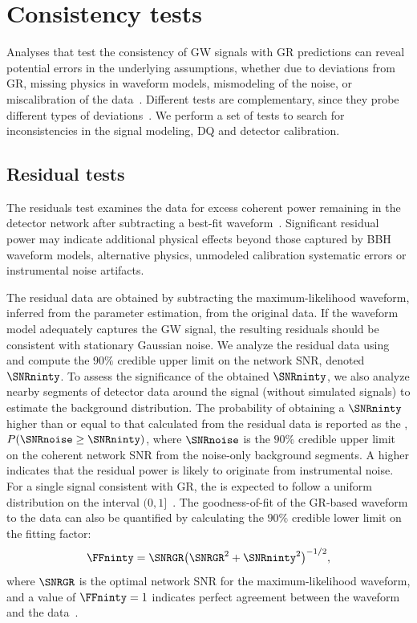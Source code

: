 \section{Consistency tests}

Analyses that test the consistency of \ac{GW} signals with \ac{GR} predictions can reveal potential errors in the underlying assumptions, whether due to deviations from \ac{GR}, missing physics in waveform models, mismodeling of the noise, or miscalibration of the data~\cite{LIGOScientific:2021sio,Gupta:2024gun,LIGOScientific:2025cmm}.
Different tests are complementary, since they probe different types of deviations~\cite{Johnson-McDaniel:2021yge}.
We perform a set of tests to search for inconsistencies in the signal modeling, \ac{DQ} and detector calibration.

\subsection{Residual tests}
The residuals test examines the data for excess coherent power remaining in the detector network after subtracting a best-fit waveform~\cite{LIGOScientific:2021sio,Johnson-McDaniel:2021yge,LIGOScientific:2026qni}.
Significant residual power may indicate additional physical effects beyond those captured by \ac{BBH} waveform models, alternative physics, unmodeled calibration systematic errors or instrumental noise artifacts.

The residual data are obtained by subtracting the maximum-likelihood waveform, inferred from the parameter estimation, from the original data.
If the waveform model adequately captures the \ac{GW} signal, the resulting residuals should be consistent with stationary Gaussian noise.
We analyze the residual data using \BAYESWAVE{}~\cite{Cornish:2014kda,Littenberg:2015kpb,Cornish:2020dwh} and compute the $90\%$ credible upper limit on the network \ac{SNR}, denoted $\SNRninty$.
To assess the significance of the obtained $\SNRninty$, we also analyze nearby segments of detector data around the signal (without simulated signals) to estimate the background distribution.
The probability of obtaining a $\SNRninty$ higher than or equal to that calculated from the residual data is reported as the \pvalue{}, $P(\SNRnoise \geq \SNRninty)$, where $\SNRnoise$ is the $90\%$ credible upper limit on the coherent network \ac{SNR} from the noise-only background segments.
A higher \pvalue{} indicates that the residual power is likely to originate from instrumental noise.
For a single signal consistent with \ac{GR}, the \pvalue{} is expected to follow a uniform distribution on the interval $(0,1]$~\cite{LIGOScientific:2021sio}.
The goodness-of-fit of the \ac{GR}-based waveform to the data can also be quantified by calculating the $90\%$ credible lower limit on the fitting factor:
\begin{equation}
	\FFninty = {\SNRGR}{\left(\SNRGR^{2} + \SNRninty^{2}\right)^{-1/2}},
\end{equation}
where $\SNRGR$ is the optimal network \ac{SNR} for the maximum-likelihood waveform, and a value of $\FFninty = 1$ indicates perfect agreement between the waveform and the data~\cite{LIGOScientific:2021sio}.

